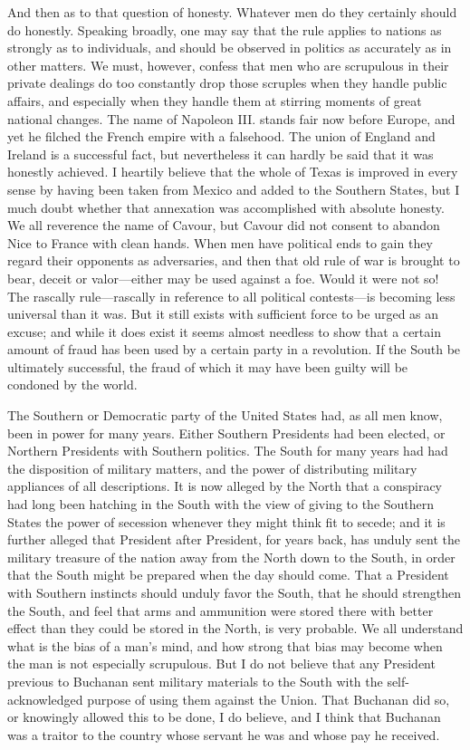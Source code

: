 And then as to that question of honesty.  Whatever men do they
certainly should do honestly.  Speaking broadly, one may say that
the rule applies to nations as strongly as to individuals, and
should be observed in politics as accurately as in other matters.
We must, however, confess that men who are scrupulous in their
private dealings do too constantly drop those scruples when they
handle public affairs, and especially when they handle them at
stirring moments of great national changes.  The name of Napoleon
III. stands fair now before Europe, and yet he filched the French
empire with a falsehood.  The union of England and Ireland is a
successful fact, but nevertheless it can hardly be said that it was
honestly achieved.  I heartily believe that the whole of Texas is
improved in every sense by having been taken from Mexico and added
to the Southern States, but I much doubt whether that annexation
was accomplished with absolute honesty.  We all reverence the name
of Cavour, but Cavour did not consent to abandon Nice to France
with clean hands.  When men have political ends to gain they regard
their opponents as adversaries, and then that old rule of war is
brought to bear, deceit or valor---either may be used against a foe.
Would it were not so!  The rascally rule---rascally in reference to
all political contests---is becoming less universal than it was.
But it still exists with sufficient force to be urged as an excuse;
and while it does exist it seems almost needless to show that a
certain amount of fraud has been used by a certain party in a
revolution.  If the South be ultimately successful, the fraud of
which it may have been guilty will be condoned by the world.

The Southern or Democratic party of the United States had, as all
men know, been in power for many years.  Either Southern Presidents
had been elected, or Northern Presidents with Southern politics.
The South for many years had had the disposition of military
matters, and the power of distributing military appliances of all
descriptions.  It is now alleged by the North that a conspiracy had
long been hatching in the South with the view of giving to the
Southern States the power of secession whenever they might think
fit to secede; and it is further alleged that President after
President, for years back, has unduly sent the military treasure of
the nation away from the North down to the South, in order that the
South might be prepared when the day should come.  That a President
with Southern instincts should unduly favor the South, that he
should strengthen the South, and feel that arms and ammunition were
stored there with better effect than they could be stored in the
North, is very probable.  We all understand what is the bias of a
man's mind, and how strong that bias may become when the man is not
especially scrupulous.  But I do not believe that any President
previous to Buchanan sent military materials to the South with the
self-acknowledged purpose of using them against the Union.  That
Buchanan did so, or knowingly allowed this to be done, I do
believe, and I think that Buchanan was a traitor to the country
whose servant he was and whose pay he received.

